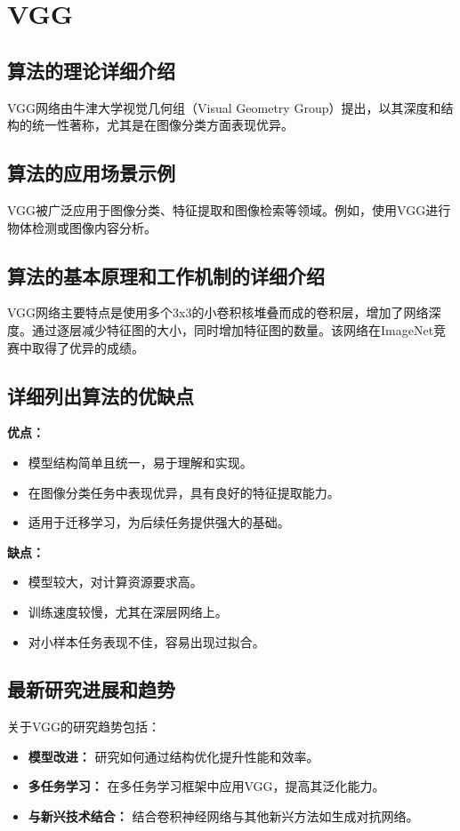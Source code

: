 \section{VGG}
\subsection*{算法的理论详细介绍}
VGG网络由牛津大学视觉几何组（Visual Geometry Group）提出，以其深度和结构的统一性著称，尤其是在图像分类方面表现优异。

\subsection*{算法的应用场景示例}
VGG被广泛应用于图像分类、特征提取和图像检索等领域。例如，使用VGG进行物体检测或图像内容分析。

\subsection*{算法的基本原理和工作机制的详细介绍}
VGG网络主要特点是使用多个3x3的小卷积核堆叠而成的卷积层，增加了网络深度。通过逐层减少特征图的大小，同时增加特征图的数量。该网络在ImageNet竞赛中取得了优异的成绩。

\subsection*{详细列出算法的优缺点}
\textbf{优点：}
\begin{itemize}
    \item 模型结构简单且统一，易于理解和实现。
    \item 在图像分类任务中表现优异，具有良好的特征提取能力。
    \item 适用于迁移学习，为后续任务提供强大的基础。
\end{itemize}

\textbf{缺点：}
\begin{itemize}
    \item 模型较大，对计算资源要求高。
    \item 训练速度较慢，尤其在深层网络上。
    \item 对小样本任务表现不佳，容易出现过拟合。
\end{itemize}

\subsection*{最新研究进展和趋势}
关于VGG的研究趋势包括：
\begin{itemize}
    \item \textbf{模型改进：} 研究如何通过结构优化提升性能和效率。
    \item \textbf{多任务学习：} 在多任务学习框架中应用VGG，提高其泛化能力。
    \item \textbf{与新兴技术结合：} 结合卷积神经网络与其他新兴方法如生成对抗网络。
\end{itemize}
